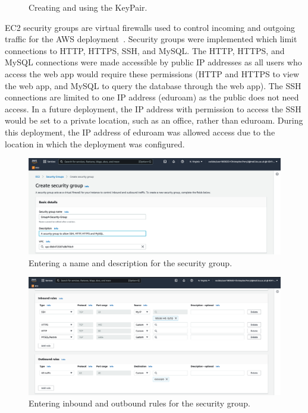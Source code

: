 \begin{figure}[!htbp]
\begin{minipage}{.5\textwidth}
        \label{fig:log-in-keypair-pem}
    \end{minipage}
    \caption{Creating and using the KeyPair.}
    \label{fig:create-use-keypair}
\end{figure}

\clearpage
EC2 security groups are virtual firewalls used to control incoming and outgoing traffic for the AWS
deployment~\parencite{amazon2022amazon2}.
Security groups were implemented which limit connections to HTTP, HTTPS, SSH, and MySQL\@.
The HTTP, HTTPS, and MySQL connections were made accessible by public IP addresses as all users who access the web app
would require these permissions (HTTP and HTTPS to view the web app, and MySQL to query the database through the web
app).
The SSH connections are limited to one IP address (eduroam) as the public does not need access.
In a future deployment, the IP address with permission to access the SSH would be set to a private location, such as an
office, rather than eduroam.
During this deployment, the IP address of eduroam was allowed access due to the location in which the deployment was
configured.

\begin{figure}[!htbp]
    \centering
    \includegraphics[width=\textwidth]{resources/security/security-group-name}
    \caption{Entering a name and description for the security group.}
    \label{fig:iam-denied}
\end{figure}

\begin{figure}[!htbp]
    \centering
    \includegraphics[width=\textwidth]{resources/security/security-group-rules}
    \caption{Entering inbound and outbound rules for the security group.}
    \label{fig:iam-denied}
\end{figure}

